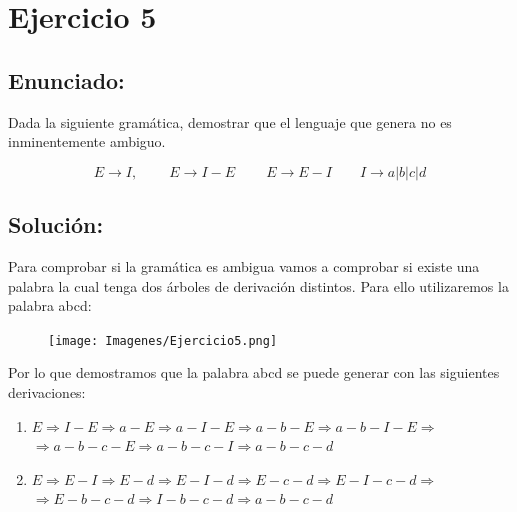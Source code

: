 \documentclass[10pt,a4paper,spanish]{report}
\begin{document}
\newpage
{}

\newpage
{}

\newpage
{}


\chapter{Ejercicio 5}

\section{Enunciado:}

\noindent
Dada la siguiente gramática, demostrar que el lenguaje que genera no es inminentemente ambiguo.

\begin{displaymath}
	E \rightarrow I, \qquad\ E \rightarrow I-E \qquad\ E \rightarrow E-I \qquad I \rightarrow a | b | c | d
\end{displaymath}

\section{Solución:}

\noindent
Para comprobar si la gramática es ambigua vamos a comprobar si existe una palabra la cual tenga dos árboles de derivación distintos. Para ello utilizaremos la palabra abcd:

\begin{figure}[!hbp]
	\centering  \texttt{[image: Imagenes/Ejercicio5.png]}
\end{figure}

\noindent
Por lo que demostramos que la palabra abcd se puede generar con las siguientes derivaciones:

\begin{enumerate}
	\item $E \Rightarrow I-E \Rightarrow a-E \Rightarrow a-I-E \Rightarrow a-b-E \Rightarrow a-b-I-E \Rightarrow$ \\ $		\Rightarrow a-b-c-E \Rightarrow a-b-c-I \Rightarrow a-b-c-d$

	\item $E \Rightarrow E-I \Rightarrow E-d \Rightarrow E-I-d \Rightarrow E-c-d	\Rightarrow E-I-c-d \Rightarrow$ \\$\Rightarrow E-b-c-d \Rightarrow I-b-c-d \Rightarrow a-b-c-d$
\end{enumerate}
\end{document}
